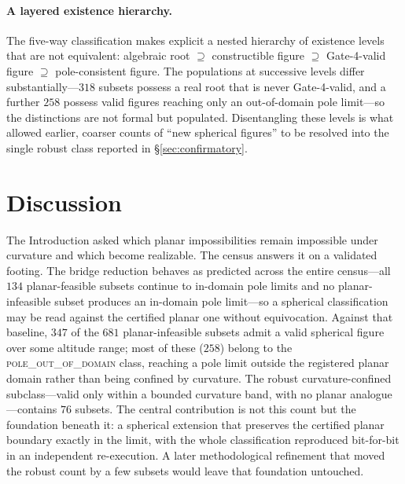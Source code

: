 \documentclass[11pt]{article}
\begin{document}
\paragraph{A layered existence hierarchy.}
The five-way classification makes explicit a nested hierarchy of existence levels that are not equivalent: algebraic root $\supseteq$ constructible figure $\supseteq$ Gate-4-valid figure $\supseteq$ pole-consistent figure. The populations at successive levels differ substantially---$318$ subsets possess a real root that is never Gate-4-valid, and a further $258$ possess valid figures reaching only an out-of-domain pole limit---so the distinctions are not formal but populated. Disentangling these levels is what allowed earlier, coarser counts of ``new spherical figures'' to be resolved into the single robust class reported in \S\ref{sec:confirmatory}.
\section{Discussion}
\label{sec:discussion}

The Introduction asked which planar impossibilities remain impossible under curvature and which become realizable. The census answers it on a validated footing. The bridge reduction behaves as predicted across the entire census---all $134$ planar-feasible subsets continue to in-domain pole limits and no planar-infeasible subset produces an in-domain pole limit---so a spherical classification may be read against the certified planar one without equivocation. Against that baseline, $347$ of the $681$ planar-infeasible subsets admit a valid spherical figure over some altitude range; most of these ($258$) belong to the \textsc{pole\_out\_of\_domain} class, reaching a pole limit outside the registered planar domain rather than being confined by curvature. The robust curvature-confined subclass---valid only within a bounded curvature band, with no planar analogue---contains $76$ subsets. The central contribution is not this count but the foundation beneath it: a spherical extension that preserves the certified planar boundary exactly in the limit, with the whole classification reproduced bit-for-bit in an independent re-execution. A later methodological refinement that moved the robust count by a few subsets would leave that foundation untouched.
\end{document}
